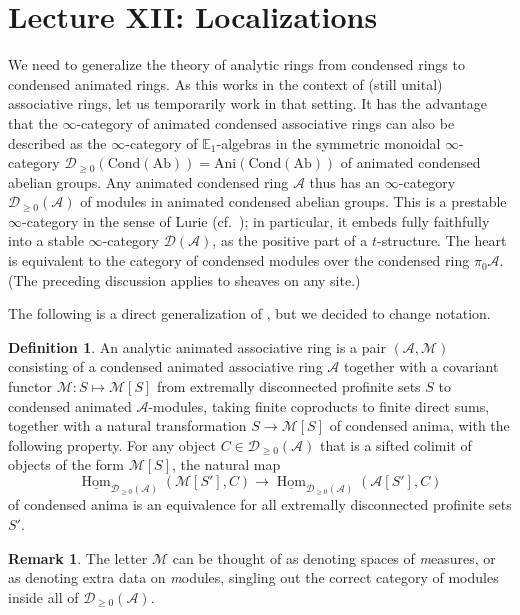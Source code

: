 \documentclass[11pt]{amsbook}
\DeclareMathOperator{\Hom}{Hom}
\newcommand{\intHom}{\underline{\Hom}}
\numberwithin{equation}{section}
\numberwithin{theorem}{section}
\theoremstyle{definition}
\newtheorem{remark}[theorem]{Remark}
\newtheorem{definition}[theorem]{Definition}
\begin{document}
\newpage

\section{Lecture XII: Localizations}

We need to generalize the theory of analytic rings from condensed rings to condensed animated rings. As this works in the context of (still unital) associative rings, let us temporarily work in that setting. It has the advantage that the $\infty$-category of animated condensed associative rings can also be described as the $\infty$-category of $\mathbb E_1$-algebras in the symmetric monoidal $\infty$-category $\mathcal D_{\geq 0}(\mathrm{Cond}(\mathrm{Ab}))=\mathrm{Ani}(\mathrm{Cond}(\mathrm{Ab}))$ of animated condensed abelian groups. Any animated condensed ring $\mathcal A$ thus has an $\infty$-category $\mathcal D_{\geq 0}(\mathcal A)$ of modules in animated condensed abelian groups. This is a prestable $\infty$-category in the sense of Lurie (cf.~\cite[Appendix C]{LurieSAG}); in particular, it embeds fully faithfully into a stable $\infty$-category $\mathcal D(\mathcal A)$, as the positive part of a $t$-structure. The heart is equivalent to the category of condensed modules over the condensed ring $\pi_0 \mathcal A$. (The preceding discussion applies to sheaves on any site.)

The following is a direct generalization of \cite[Definition 7.1, 7.4]{Condensed}, but we decided to change notation.

\begin{definition}\label{def:analyticanimated} An analytic animated associative ring is a pair $(\mathcal A,\mathcal M)$ consisting of a condensed animated associative ring $\mathcal A$ together with a covariant functor $\mathcal M: S\mapsto \mathcal M[S]$ from extremally disconnected profinite sets $S$ to condensed animated $\mathcal A$-modules, taking finite coproducts to finite direct sums, together with a natural transformation $S\to \mathcal M[S]$ of condensed anima, with the following property. For any object $C\in \mathcal D_{\geq 0}(\mathcal A)$ that is a sifted colimit of objects of the form $\mathcal M[S]$, the natural map
\[
\intHom_{\mathcal D_{\geq 0}(\mathcal A)}(\mathcal M[S'],C)\to \intHom_{\mathcal D_{\geq 0}(\mathcal A)}(\mathcal A[S'],C)
\]
of condensed anima is an equivalence for all extremally disconnected profinite sets $S'$.
\end{definition}

\begin{remark} The letter $\mathcal M$ can be thought of as denoting spaces of {\it m}easures, or as denoting extra data on {\it m}odules, singling out the correct category of modules inside all of $\mathcal D_{\geq 0}(\mathcal A)$.
\end{remark}
\end{document}
